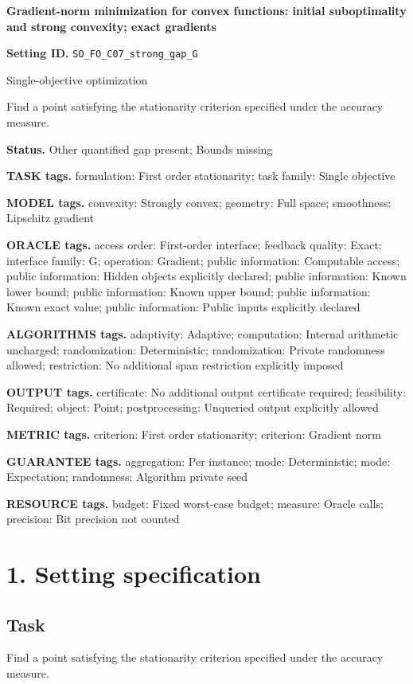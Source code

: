 \documentclass[10pt,a4paper]{article}
\begin{document}
\raggedright

{\LARGE\bfseries\sffamily\color{AtlasNavy} Gradient-norm minimization for convex functions: initial suboptimality and strong convexity; exact gradients\par}\vspace{5pt}
\textbf{Setting ID.} \texttt{SO\_\allowbreak{}FO\_\allowbreak{}C07\_\allowbreak{}strong\_\allowbreak{}gap\_\allowbreak{}G}

Single-objective optimization

Find a point satisfying the stationarity criterion specified under the accuracy measure.

\textbf{Status.} Other quantified gap present; Bounds missing

\textbf{TASK tags.} formulation: First order stationarity; task family: Single objective

\textbf{MODEL tags.} convexity: Strongly convex; geometry: Full space; smoothness: Lipschitz gradient

\textbf{ORACLE tags.} access order: First-order interface; feedback quality: Exact; interface family: G; operation: Gradient; public information: Computable access; public information: Hidden objects explicitly declared; public information: Known lower bound; public information: Known upper bound; public information: Known exact value; public information: Public inputs explicitly declared

\textbf{ALGORITHMS tags.} adaptivity: Adaptive; computation: Internal arithmetic uncharged; randomization: Deterministic; randomization: Private randomness allowed; restriction: No additional span restriction explicitly imposed

\textbf{OUTPUT tags.} certificate: No additional output certificate required; feasibility: Required; object: Point; postprocessing: Unqueried output explicitly allowed

\textbf{METRIC tags.} criterion: First order stationarity; criterion: Gradient norm

\textbf{GUARANTEE tags.} aggregation: Per instance; mode: Deterministic; mode: Expectation; randomness: Algorithm private seed

\textbf{RESOURCE tags.} budget: Fixed worst-case budget; measure: Oracle calls; precision: Bit precision not counted

\section{1. Setting specification}
\subsection{Task}
Find a point satisfying the stationarity criterion specified under the accuracy measure.
\end{document}
